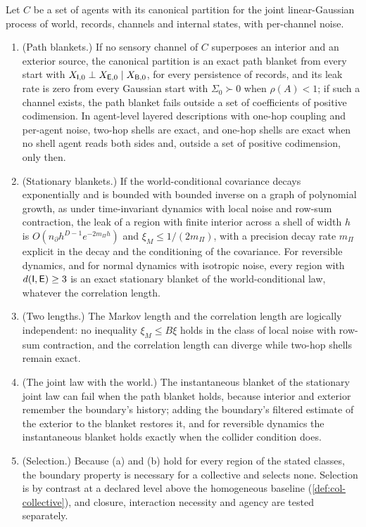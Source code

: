 \begin{theorem}\label{thm:col-boundary}
Let $C$ be a set of agents with its canonical partition for the joint linear-Gaussian process of world, records, channels and internal states, with per-channel noise.
\begin{enumerate}
\item[(a)] (Path blankets.) If no sensory channel of $C$ superposes an interior and an exterior source, the canonical partition is an exact path blanket from every start with $X_{\mathsf{I},0}\perp X_{\mathsf{E},0}\mid X_{\mathsf{B},0}$, for every persistence of records, and its leak rate is zero from every Gaussian start with $\Sigma_0\succ0$ when $\rho(A)<1$; if such a channel exists, the path blanket fails outside a set of coefficients of positive codimension. In agent-level layered descriptions with one-hop coupling and per-agent noise, two-hop shells are exact, and one-hop shells are exact when no shell agent reads both sides and, outside a set of positive codimension, only then.
\item[(b)] (Stationary blankets.) If the world-conditional covariance decays exponentially and is bounded with bounded inverse on a graph of polynomial growth, as under time-invariant dynamics with local noise and row-sum contraction, the leak of a region with finite interior across a shell of width $h$ is $O(n_\partial h^{D-1}e^{-2m_\Pi h})$ and $\xi_M\le1/(2m_\Pi)$, with a precision decay rate $m_\Pi$ explicit in the decay and the conditioning of the covariance. For reversible dynamics, and for normal dynamics with isotropic noise, every region with $d(\mathsf{I},\mathsf{E})\ge3$ is an exact stationary blanket of the world-conditional law, whatever the correlation length.
\item[(c)] (Two lengths.) The Markov length and the correlation length are logically independent: no inequality $\xi_M\le B\xi$ holds in the class of local noise with row-sum contraction, and the correlation length can diverge while two-hop shells remain exact.
\item[(d)] (The joint law with the world.) The instantaneous blanket of the stationary joint law can fail when the path blanket holds, because interior and exterior remember the boundary's history; adding the boundary's filtered estimate of the exterior to the blanket restores it, and for reversible dynamics the instantaneous blanket holds exactly when the collider condition does.
\item[(e)] (Selection.) Because (a) and (b) hold for every region of the stated classes, the boundary property is necessary for a collective and selects none. Selection is by contrast at a declared level above the homogeneous baseline (\cref{def:col-collective}), and closure, interaction necessity and agency are tested separately.
\end{enumerate}
\end{theorem}
